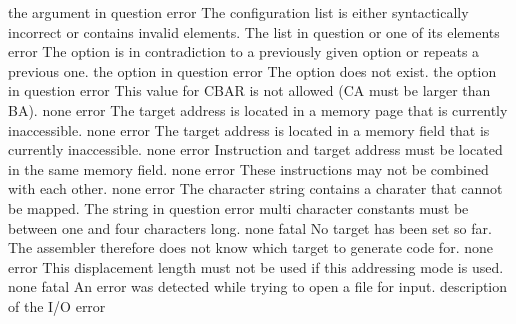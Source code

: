 \documentclass[12pt,twoside]{report}
\begin{document}
\begin{description}
               {the argument in question}
               {error}
               {The configuration list is either syntactically incorrect or
                contains invalid elements.}
               {The list in question or one of its elements}
               {error}
               {The option is in contradiction to a previously given option or repeats a previous one.}
               {the option in question}
               {error}
               {The option does not exist.}
               {the option in question}
               {error}
               {This value for CBAR is not allowed (CA must be larger than BA).}
               {none}
               {error}
               {The target address is located in a memory page that is currently
                inaccessible.}
               {none}
               {error}
               {The target address is located in a memory field that is currently
                inaccessible.}
               {none}
               {error}
               {Instruction and target address must be located in the
                same memory field.}
               {none}
               {error}
               {These instructions may not be combined with each other.}
               {none}
               {error}
               {The character string contains a charater that cannot be mapped.}
               {The string in question}
               {error}
               {multi character constants must be between one and four characters long.}
               {none}
               {fatal}
               {No target has been set so far.  The assembler therefore does
                not know which target to generate code for.}
               {none}
               {error}
               {This displacement length must not be used if this addressing
                mode is used.}
               {none}
               {fatal}
               {An error was detected while trying to open a file for input.}
               {description of the I/O error}

\end{description}
\end{document}
